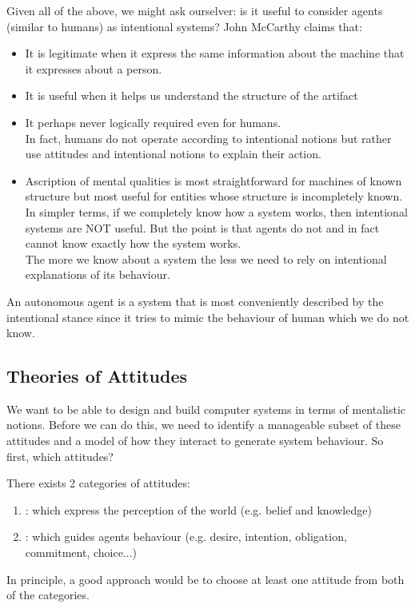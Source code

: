 Given all of the above, we might ask ourselver: is it useful to consider agents (similar to humans) as intentional systems? John McCarthy claims that:
\begin{itemize}
\item It is legitimate when it express the same information about the machine that it expresses about a person. 
\item It is useful when it helps us understand the structure of the artifact
\item It perhaps never logically required even for humans. \\
In fact, humans do not operate according to intentional notions but rather use attitudes and intentional notions to explain their action.
\item Ascription of mental qualities is most straightforward for machines of known structure but most useful for entities whose structure is incompletely known.\\
In simpler terms, if we completely know how a system works, then intentional systems are NOT useful. But the point is that agents do not and in fact cannot know exactly how the system works.\\
The more we know about a system the less we need to rely on intentional explanations of its behaviour.
\end{itemize}
An autonomous agent is a system that is most conveniently described by the intentional stance since it tries to mimic the behaviour of human which we do not know. 
\subsection{Theories of Attitudes}
We want to be able to design and build computer systems in terms of mentalistic notions.
Before we can do this, we need to identify a manageable subset of these attitudes and a model of how they interact to generate system behaviour. So first, which attitudes?

There exists 2 categories of attitudes:
\begin{enumerate}
\item {}: which express the perception of the world (e.g. belief and knowledge)
\item {}: which guides agents behaviour (e.g. desire, intention, obligation, commitment, choice...)
\end{enumerate}
In principle, a good approach would be to choose at least one attitude from both of the categories.

